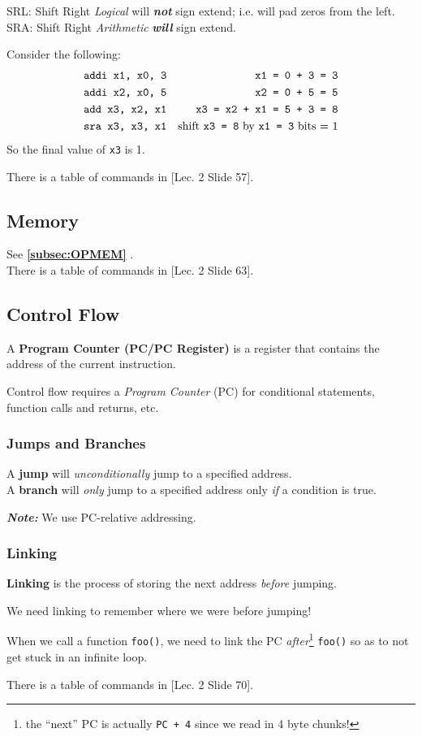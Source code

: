 \documentclass{report}
\newcommand{\refto}[2]{\textbf{\ref{#1:#2} \nameref{#1:#2}}}
\newcommand{\definition}[2]{\begin{tcolorbox}[title={Definition: #1}]{#2}\end{tcolorbox}}
\newcommand{\example}[2]{\begin{tcolorbox}[colback=blue!5!white,colframe=black!75!blue,title={Example:
      #1}]{#2}\end{tcolorbox}}
\newcommand{\aside}[2]{\begin{tcolorbox}[colback=orange!5!white,colframe=black!75!orange,title={Aside:
      #1}]{#2}\end{tcolorbox}}
\begin{document}
\aside{Shift Right Logical/Arithmetic}{
  SRL: Shift Right \textit{Logical} will \textbf{\textit{not}} sign extend; i.e. will pad zeros from
  the left. \\
  SRA: Shift Right \textit{Arithmetic} \textbf{\textit{will}} sign extend.
}

\example{}{
  Consider the following:
  \begin{align*}
    &\texttt{addi x1, x0, 3} & \texttt{x1 = 0 + 3 = 3} \\
    &\texttt{addi x2, x0, 5} & \texttt{x2 = 0 + 5 = 5} \\
    &\texttt{add x3, x2, x1} & \texttt{x3 = x2 + x1 = 5 + 3 = 8} \\
    &\texttt{sra x3, x3, x1} & \text{shift \texttt{x3 = 8} by \texttt{x1 = 3} bits = 1}
  \end{align*}
  So the final value of \texttt{x3} is 1.
}
There is a table of commands in [Lec. 2 Slide 57].


\subsection{Memory}
See \refto{subsec}{OPMEM}. \\
There is a table of commands in [Lec. 2 Slide 63].


\subsection{Control Flow}
\definition{Program Counter/PC Register}{
  A \textbf{Program Counter (PC/PC Register)} is a register that contains the address of the current
  instruction.
}
Control flow requires a \textit{Program Counter} (PC) for conditional statements, function calls and
returns, etc.

\subsubsection{Jumps and Branches}
\definition{Jump and Branch}{
  A \textbf{jump} will \textit{unconditionally} jump to a specified address. \\
  A \textbf{branch} will \textit{only} jump to a specified address only \textit{if} a condition is true.
}

\textbf{\textit{Note:}} We use PC-relative addressing.

\subsubsection{Linking}
\definition{Linking}{
  \textbf{Linking} is the process of storing the next address \textit{before} jumping.
}
We need linking to remember where we were before jumping!
\example{Sneaky Link}{
  When we call a function \texttt{foo()}, we need to link the PC \textit{after}\footnote{the
    ``next'' PC is actually \texttt{PC + 4} since we read in 4 byte chunks!} \texttt{foo()} so as to not
  get stuck in an infinite loop.
}
There is a table of commands in [Lec. 2 Slide 70].
\end{document}
